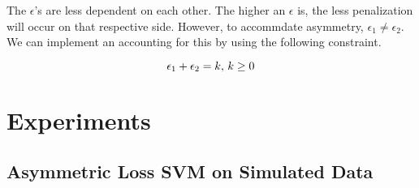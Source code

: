 \documentclass[twoside,11pt]{article}
\begin{document}
The $\epsilon$'s are less dependent on each other. The higher an $\epsilon$ is, the less penalization will occur on that respective side. However, to accommdate asymmetry, $\epsilon_1 \neq \epsilon_2$. We can implement an accounting for this by using the following constraint.

\begin{equation}\label{epsilon constraint}
\epsilon_1 + \epsilon_2=k \\
\text{, } k \geq 0
\end{equation}

\section{Experiments}
\subsection{Asymmetric Loss SVM on Simulated Data}\label{simulation}
\end{document}
